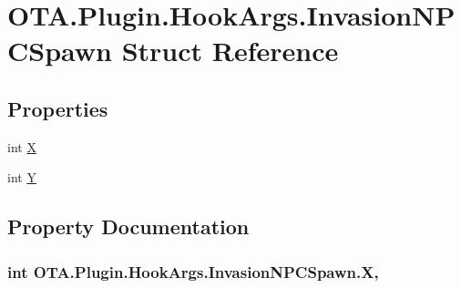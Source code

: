 \hypertarget{struct_o_t_a_1_1_plugin_1_1_hook_args_1_1_invasion_n_p_c_spawn}{}\section{O\+T\+A.\+Plugin.\+Hook\+Args.\+Invasion\+N\+P\+C\+Spawn Struct Reference}
\label{struct_o_t_a_1_1_plugin_1_1_hook_args_1_1_invasion_n_p_c_spawn}
\subsection*{Properties}
\begin{DoxyCompactItemize}
\item 
int \hyperlink{struct_o_t_a_1_1_plugin_1_1_hook_args_1_1_invasion_n_p_c_spawn_afe3c19f97c72f3e0b05a6f023046b7a7}{X}
\item 
int \hyperlink{struct_o_t_a_1_1_plugin_1_1_hook_args_1_1_invasion_n_p_c_spawn_a70c8410b13bc21cf0456d2300fc21721}{Y}
\end{DoxyCompactItemize}


\subsection{Property Documentation}
\hypertarget{struct_o_t_a_1_1_plugin_1_1_hook_args_1_1_invasion_n_p_c_spawn_afe3c19f97c72f3e0b05a6f023046b7a7}{}
\subsubsection[{X}]{\setlength{\rightskip}{0pt plus 5cm}int O\+T\+A.\+Plugin.\+Hook\+Args.\+Invasion\+N\+P\+C\+Spawn.\+X\hspace{0.3cm}{\ttfamily [get]}, {\ttfamily [set]}}\label{struct_o_t_a_1_1_plugin_1_1_hook_args_1_1_invasion_n_p_c_spawn_afe3c19f97c72f3e0b05a6f023046b7a7}
\hypertarget{struct_o_t_a_1_1_plugin_1_1_hook_args_1_1_invasion_n_p_c_spawn_a70c8410b13bc21cf0456d2300fc21721}{}
